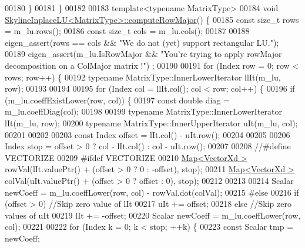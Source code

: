 \begin{DoxyCode}
00180     \}
00181 \}
00182 
00183 \textcolor{keyword}{template}<\textcolor{keyword}{typename} MatrixType>
00184 \textcolor{keywordtype}{void} \hyperlink{class_eigen_1_1_skyline_inplace_l_u}{SkylineInplaceLU<MatrixType>::computeRowMajor}() \{
00185     \textcolor{keyword}{const} \textcolor{keywordtype}{size\_t} rows = m\_lu.rows();
00186     \textcolor{keyword}{const} \textcolor{keywordtype}{size\_t} cols = m\_lu.cols();
00187 
00188     eigen\_assert(rows == cols && \textcolor{stringliteral}{"We do not (yet) support rectangular LU."});
00189     eigen\_assert(m\_lu.IsRowMajor && \textcolor{stringliteral}{"You're trying to apply rowMajor decomposition on a ColMajor matrix !"})
      ;
00190 
00191     \textcolor{keywordflow}{for} (Index row = 0; row < rows; row++) \{
00192         \textcolor{keyword}{typename} MatrixType::InnerLowerIterator llIt(m\_lu, row);
00193 
00194 
00195         \textcolor{keywordflow}{for} (Index col = llIt.col(); col < row; col++) \{
00196             \textcolor{keywordflow}{if} (m\_lu.coeffExistLower(row, col)) \{
00197                 \textcolor{keyword}{const} \textcolor{keywordtype}{double} diag = m\_lu.coeffDiag(col);
00198 
00199                 \textcolor{keyword}{typename} MatrixType::InnerLowerIterator lIt(m\_lu, row);
00200                 \textcolor{keyword}{typename} MatrixType::InnerUpperIterator uIt(m\_lu, col);
00201 
00202 
00203                 \textcolor{keyword}{const} Index offset = lIt.col() - uIt.row();
00204 
00205 
00206                 Index stop = offset > 0 ? col - lIt.col() : col - uIt.row();
00207 
00208                 \textcolor{comment}{//#define VECTORIZE}
00209 \textcolor{preprocessor}{#ifdef VECTORIZE}
00210                 \hyperlink{group___core___module_class_eigen_1_1_map}{Map<VectorXd >} rowVal(lIt.valuePtr() + (offset > 0 ? 0 : -offset), stop);
00211                 \hyperlink{group___core___module_class_eigen_1_1_map}{Map<VectorXd >} colVal(uIt.valuePtr() + (offset > 0 ? offset : 0), stop);
00212 
00213 
00214                 Scalar newCoeff = m\_lu.coeffLower(row, col) - rowVal.dot(colVal);
00215 \textcolor{preprocessor}{#else}
00216                 \textcolor{keywordflow}{if} (offset > 0) \textcolor{comment}{//Skip zero value of lIt}
00217                     uIt += offset;
00218                 \textcolor{keywordflow}{else} \textcolor{comment}{//Skip zero values of uIt}
00219                     lIt += -offset;
00220                 Scalar newCoeff = m\_lu.coeffLower(row, col);
00221 
00222                 \textcolor{keywordflow}{for} (Index k = 0; k < stop; ++k) \{
00223                     \textcolor{keyword}{const} Scalar tmp = newCoeff;

\end{DoxyCode}

